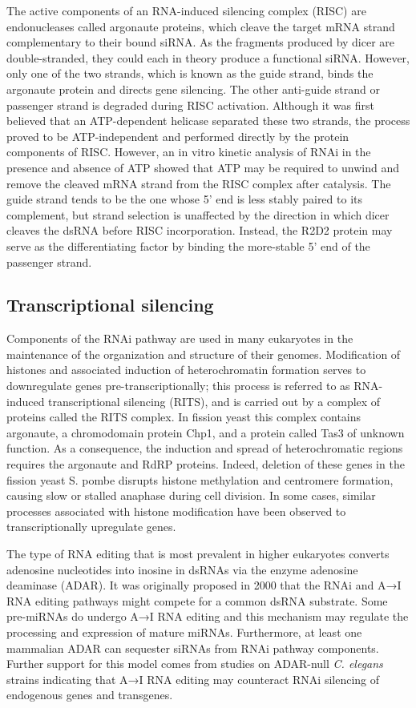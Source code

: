 The active components of an RNA-induced silencing complex (RISC) are endonucleases called argonaute proteins, which cleave the target mRNA strand complementary to their bound siRNA. As the fragments produced by dicer are double-stranded, they could each in theory produce a functional siRNA. However, only one of the two strands, which is known as the guide strand, binds the argonaute protein and directs gene silencing. The other anti-guide strand or passenger strand is degraded during RISC activation. Although it was first believed that an ATP-dependent helicase separated these two strands, the process proved to be ATP-independent and performed directly by the protein components of RISC. However, an in vitro kinetic analysis of RNAi in the presence and absence of ATP showed that ATP may be required to unwind and remove the cleaved mRNA strand from the RISC complex after catalysis. The guide strand tends to be the one whose 5' end is less stably paired to its complement, but strand selection is unaffected by the direction in which dicer cleaves the dsRNA before RISC incorporation. Instead, the R2D2 protein may serve as the differentiating factor by binding the more-stable 5' end of the passenger strand.

\hypertarget{transcriptional-silencing}{%
\subsection{Transcriptional silencing}\label{transcriptional-silencing}}

Components of the RNAi pathway are used in many eukaryotes in the maintenance of the organization and structure of their genomes. Modification of histones and associated induction of heterochromatin formation serves to downregulate genes pre-transcriptionally; this process is referred to as RNA-induced transcriptional silencing (RITS), and is carried out by a complex of proteins called the RITS complex. In fission yeast this complex contains argonaute, a chromodomain protein Chp1, and a protein called Tas3 of unknown function. As a consequence, the induction and spread of heterochromatic regions requires the argonaute and RdRP proteins. Indeed, deletion of these genes in the fission yeast S. pombe disrupts histone methylation and centromere formation, causing slow or stalled anaphase during cell division. In some cases, similar processes associated with histone modification have been observed to transcriptionally upregulate genes.

The type of RNA editing that is most prevalent in higher eukaryotes converts adenosine nucleotides into inosine in dsRNAs via the enzyme adenosine deaminase (ADAR). It was originally proposed in 2000 that the RNAi and A→I RNA editing pathways might compete for a common dsRNA substrate. Some pre-miRNAs do undergo A→I RNA editing and this mechanism may regulate the processing and expression of mature miRNAs. Furthermore, at least one mammalian ADAR can sequester siRNAs from RNAi pathway components. Further support for this model comes from studies on ADAR-null \emph{C. elegans} strains indicating that A→I RNA editing may counteract RNAi silencing of endogenous genes and transgenes.

